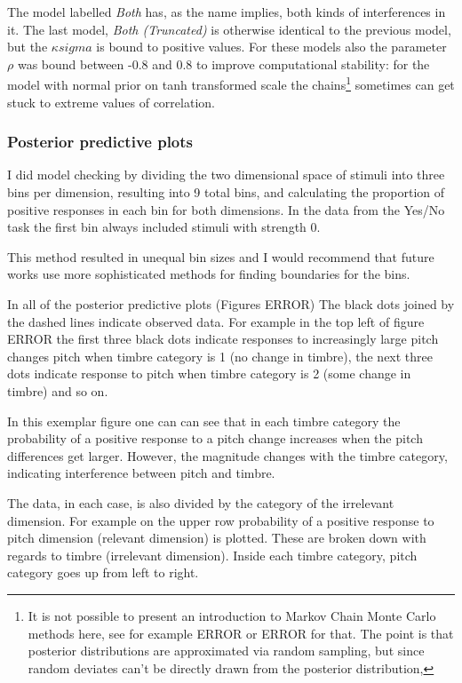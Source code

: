 \documentclass{article}\usepackage{knitr}
\begin{document}
The model labelled \textit{Both} has, as the name implies, both kinds of interferences in it. The last model, \textit{Both (Truncated)} is otherwise identical to the previous model, but the $\kappa{sigma}$ is bound to positive values. For these models also the parameter $\rho$ was bound between -0.8 and 0.8 to improve computational stability: for the model with normal prior on tanh transformed scale the chains\footnote{It is not possible to present an introduction to Markov Chain Monte Carlo methods here, see for example  ERROR or ERROR for that. The point is that posterior distributions are approximated via random sampling, but since random deviates can't be directly drawn from the posterior distribution,  } sometimes can get stuck to extreme values of correlation.

\subsubsection{Posterior predictive plots}

I did model checking by dividing the two dimensional space of stimuli into three bins per dimension, resulting into 9 total bins, and calculating the proportion of positive responses in each bin for both dimensions. In the data from the Yes/No task the first bin always included stimuli with strength 0.

This method resulted in unequal bin sizes and I would recommend that future works use more sophisticated methods for finding boundaries for the bins. 

In all of the posterior predictive plots (Figures ERROR) The black dots joined by the dashed lines indicate observed data. For example in the top left of figure ERROR the first three black dots indicate responses to increasingly large pitch changes pitch when timbre category is 1 (no change in timbre), the next three dots indicate response to pitch when timbre category is 2 (some change in timbre) and so on. 

In this exemplar figure one can can see that in each timbre category the probability of a positive response to a pitch change increases when the pitch differences get larger. However, the magnitude changes with the timbre category, indicating interference between pitch and timbre.

The data, in each case, is also divided by the category of the irrelevant dimension. For example on the upper row probability of a positive response to pitch dimension (relevant dimension) is plotted. These are broken down with regards to timbre (irrelevant dimension). Inside each timbre category, pitch category goes up from left to right. 
\end{document}
